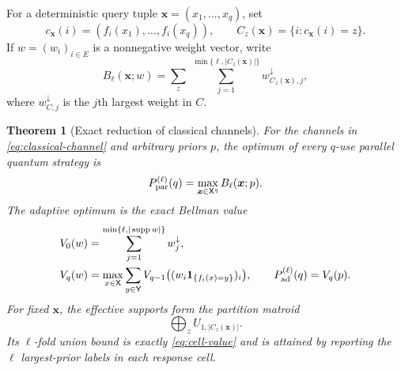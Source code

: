 \documentclass[11pt]{article}
\newtheorem{theorem}{Theorem}[section]
\theoremstyle{definition}
\theoremstyle{remark}
\newcommand{\supp}{\operatorname{supp}}
\begin{document}
For a deterministic query tuple $\bm x=(x_1,\ldots,x_q)$, set
\[
 c_{\bm x}(i)=(f_i(x_1),\ldots,f_i(x_q)),\qquad
 C_z(\bm x)=\{i:c_{\bm x}(i)=z\}.
\]
If $w=(w_i)_{i\in E}$ is a nonnegative weight vector, write
\begin{equation}\label{eq:cell-value}
 B_\ell(\bm x;w)=
 \sum_z\ \sum_{j=1}^{\min\{\ell,|C_z(\bm x)|\}}
 w^{\downarrow}_{C_z(\bm x),j},
\end{equation}
where $w^{\downarrow}_{C,j}$ is the $j$th largest weight in $C$.

\begin{theorem}[Exact reduction of classical channels]
\label{thm:classical-reduction}
For the channels in \eqref{eq:classical-channel} and arbitrary priors $p$,
the optimum of every $q$-use parallel quantum strategy is
\begin{equation}\label{eq:parallel-cell}
 P_{\rm par}^{(\ell)}(q)=
 \max_{\bm x\in\mathsf X^q}B_\ell(\bm x;p).
\end{equation}
The adaptive optimum is the exact Bellman value
\begin{align}
 V_0(w)&=\sum_{j=1}^{\min\{\ell,|\supp w|\}}w_j^\downarrow,
 \label{eq:bellman0}\\
 V_q(w)&=\max_{x\in\mathsf X}\sum_{y\in\mathsf Y}
 V_{q-1}\bigl((w_i\mathbf1_{\{f_i(x)=y\}})_i\bigr),
 \qquad P_{\rm ad}^{(\ell)}(q)=V_q(p).
 \label{eq:bellman}
\end{align}
For fixed $\bm x$, the effective supports form the partition matroid
\begin{equation}\label{eq:partition-matroid}
 \bigoplus_z U_{1,|C_z(\bm x)|}.
\end{equation}
Its $\ell$-fold union bound is exactly \eqref{eq:cell-value} and is attained
by reporting the $\ell$ largest-prior labels in each response cell.
\end{theorem}
\end{document}
